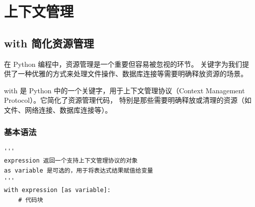 \chapter{上下文管理}

\section{with 简化资源管理}
在 Python 编程中，资源管理是一个重要但容易被忽视的环节。
 关键字为我们提供了一种优雅的方式来处理文件操作、数据库连接等需要明确释放资源的场景。

with 是 Python 中的一个关键字，用于上下文管理协议（Context Management Protocol）。它简化了资源管理代码，
特别是那些需要明确释放或清理的资源（如文件、网络连接、数据库连接等）。

\subsection{基本语法}
\begin{lstlisting}[style=demostyle,numbers=none]
'''
expression 返回一个支持上下文管理协议的对象
as variable 是可选的，用于将表达式结果赋值给变量
'''    
with expression [as variable]:
    # 代码块
\end{lstlisting}


